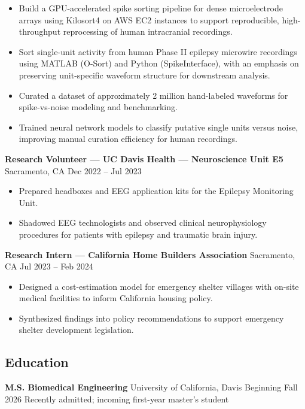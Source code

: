 \documentclass[11pt]{article}
\begin{document}
\begin{itemize}
\tightlist
\item
  Build a GPU-accelerated spike sorting pipeline for dense
  microelectrode arrays using Kilosort4 on AWS EC2 instances to support
  reproducible, high-throughput reprocessing of human intracranial
  recordings.
\item
  Sort single-unit activity from human Phase II epilepsy microwire
  recordings using MATLAB (O-Sort) and Python (SpikeInterface), with an
  emphasis on preserving unit-specific waveform structure for downstream
  analysis.
\item
  Curated a dataset of approximately 2 million hand-labeled waveforms
  for spike-vs-noise modeling and benchmarking.
\item
  Trained neural network models to classify putative single units versus
  noise, improving manual curation efficiency for human recordings.
\end{itemize}

\textbf{Research Volunteer --- UC Davis Health --- Neuroscience Unit E5}
\textbar{} Sacramento, CA \textbar{} Dec 2022 -- Jul 2023

\begin{itemize}
\tightlist
\item
  Prepared headboxes and EEG application kits for the Epilepsy
  Monitoring Unit.
\item
  Shadowed EEG technologists and observed clinical neurophysiology
  procedures for patients with epilepsy and traumatic brain injury.
\end{itemize}

\textbf{Research Intern --- California Home Builders Association}
\textbar{} Sacramento, CA \textbar{} Jul 2023 -- Feb 2024

\begin{itemize}
\tightlist
\item
  Designed a cost-estimation model for emergency shelter villages with
  on-site medical facilities to inform California housing policy.
\item
  Synthesized findings into policy recommendations to support emergency
  shelter development legislation.
\end{itemize}

\subsection{Education}\label{education}

\textbf{M.S. Biomedical Engineering} \textbar{} University of
California, Davis \textbar{} Beginning Fall 2026 Recently admitted;
incoming first-year master's student
\end{document}
